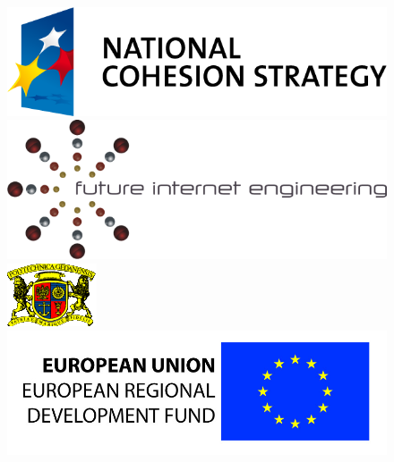 \begin{figure}[ht]
\begin{minipage}[b]{0.27\textwidth}
\centering
\vspace*{\fill}
\includegraphics[scale=0.45]{logo-nss}
\vspace*{\fill}
\end{minipage}
\begin{minipage}[b]{0.28\textwidth}
\centering
\includegraphics[scale=0.7]{logo-iip}
\end{minipage}
\begin{minipage}[b]{0.16\textwidth}
\centering
\includegraphics[scale=0.6]{logo-pg}
\end{minipage}
\begin{minipage}[b]{0.26\textwidth}
\centering
\includegraphics[scale=0.75]{logo-eu}
\end{minipage}
\end{figure}

\vspace{1cm}

